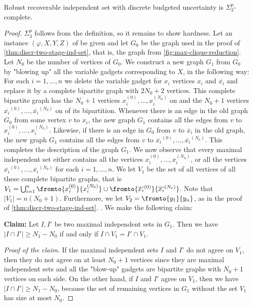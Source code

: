 \documentclass[a4paper,abstracton]{scrartcl}
\begin{document}
\begin{theorem}
\label{thm:recoverable-ind-set}
Robust recoverable independent set with discrete budgeted uncertainty is $\Sigma_3^p$-complete.
\end{theorem}
\begin{proof}
 $\Sigma_3^p$ follows from the definition, so it remains to show hardness.
Let an instance $(\varphi, X, Y, Z)$ of {\radj} be given and let $G_0$ be the graph used in the proof of \cref{thm:discr-two-stage-ind-set}, that is, the graph from \cref{fig:max-clique-reduction}. 
Let $N_0$ be the number of vertices of $G_0$. 
We construct a new graph $G_1$ from $G_0$ by "blowing up" all the variable gadgets corresponding to $X$, in the following way: For each $i=1,\dots,n$ we delete the variable gadget for $x_i$  vertices $x_i$ and $\overline{x_i}$ and replace it by a complete bipartite graph with $2N_0 + 2$ vertices.
 This complete bipartite graph has the $N_0+1$ vertices $x_i^{(0)},\dots,x_i^{(N_0)}$ on  and the $N_0+1$ vertices $\overline{x_i}^{(0)},\dots,\overline{x_i}^{(N_0)}$ on  of its bipartition.
 Whenever there is an edge in the old graph $G_0$ from some vertex $v$ to $x_i$, the new graph $G_1$ contains all the edges from $v$ to $x_i^{(0)},\dots,x_i^{(N_0)}$. 
 Likewise, if there is an edge in $G_0$ from $v$ to $\overline x_i$ in the old graph, the new graph $G_1$ contains all the edges from $v$ to $\overline{x_i}^{(0)},\dots,\overline{x_i}^{(N_0)}$. 
 This completes the description of the graph $G_1$. 
 We now observe that every maximal independent set either contains all the vertices $x_i^{(0)},\dots,x_i^{(N_0)}$, or all the vertices $\overline{x_i}^{(0)},\dots,\overline{x_i}^{(N_0)}$ for each $i=1,\dots,n$. 
 We let $V_1$ be the set of all vertices of all these complete bipartite graphs, that is $V_1 = \bigcup_{i=1}^n \fromto{x_i^{(0)}}{x_i^{(N_0)}} \cup \fromto{\overline{x_i}^{(0)}}{\overline{x_i}^{(N_0)}}$. Note that $|V_1| = n(N_0+1)$. Furthermore, we let $V_2 = \fromto{y_1}{y_n}$, as in the proof of \cref{thm:discr-two-stage-ind-set}.
. We make the following claim:

\textbf{Claim:} Let $I, I'$ be two maximal independent sets in $G_1$. Then we have $|I \cap I'| \geq N_1 - N_0$ if and only if $I \cap V_1 = I' \cap V_1$.

\emph{Proof of the claim.} If the maximal independent sets $I$ and $I'$ do not agree on $V_1$, then they do not agree on at least $N_0 + 1$ vertices since they are maximal independent sets and all the "blow-up" gadgets are bipartite graphs with $N_0+1$ vertices on each side. 
On the other hand, if $I$ and $I'$ agree on $V_1$, then we have $|I \cap I'| \geq N_1 - N_0$, because the set of remaining vertices in $G_1$ without the set $V_1$ has size at most $N_0$.



\end{proof}
\end{document}
